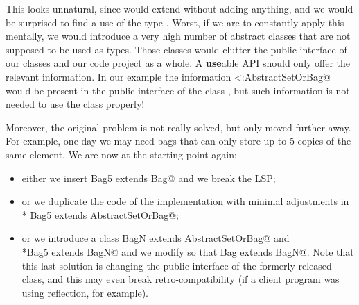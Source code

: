 This looks unnatural, since \Q@Set@ would extend \Q@AbstractSetOrBag@ without adding anything,
and we would be surprised to find a use of the type \Q@AbstractSetOrBag@.
Worst, if we are to constantly apply this mentally, we would introduce a very high number
of abstract classes that are not supposed to be used as types. Those classes would clutter the 
public interface of our classes and our code project as a whole.
A \textbf{use}able API should only offer the relevant information.
In our example the information \Q@Set<:AbstractSetOrBag@ would be present in the public interface
of the class \Q@Set@, but such information is not needed to use the class properly!

Moreover, the original problem is not really solved, but only moved 
further away. For example, one day  we may need bags that can only store up to 5 copies of the same element.
We are now at the starting point again:
\begin{itemize}
\item either we insert \Q@class Bag5 extends Bag@ and we break the LSP; 
\item or we duplicate the code of the \Q@Bag@ implementation with minimal
  adjustments in \\* \Q@class Bag5 extends AbstractSetOrBag@;
\item or we introduce a
\Q@abstract class BagN extends AbstractSetOrBag@ and \\*\Q@class Bag5 extends BagN@
and we modify \Q@Bag@ so that  \Q@class Bag extends BagN@.
Note that this last solution is changing the public interface of the formerly released \Q@Bag@ class, and
this may even break retro-compatibility (if a client program was using
reflection, for example).
\end{itemize}

